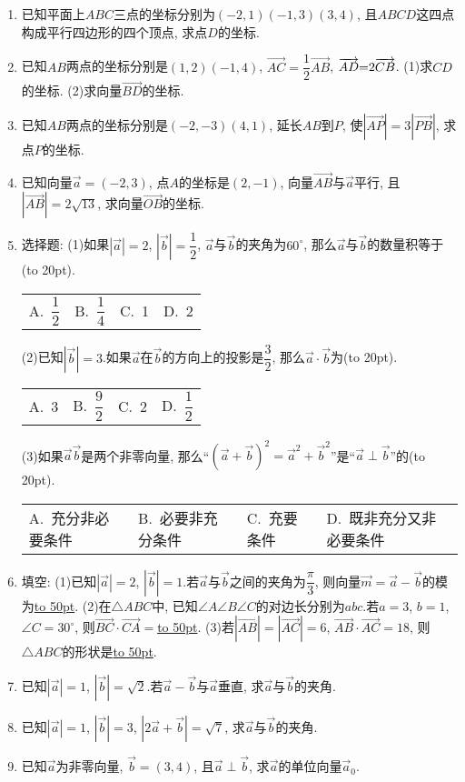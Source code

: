 \documentclass[10pt,a4paper]{article}
\newcommand{\blank}[1]{\underline{\hbox to #1pt{}}}
\newcommand{\bracket}[1]{(\hbox to #1pt{})}
\newcommand{\fourch}[4]{\par\begin{tabular}{p{.23\textwidth}p{.23\textwidth}p{.23\textwidth}p{.23\textwidth}}
A.~#1 &B.~#2& C.~#3& D.~#4
\end{tabular}}
\begin{document}
\begin{enumerate}[1.]
\item 已知平面上$ABC$三点的坐标分别为$(-2,1)(-1,3)(3,4)$, 且$ABCD$这四点构成平行四边形的四个顶点, 求点$D$的坐标.
\item 已知$AB$两点的坐标分别是$(1,2)(-1,4)$, $\overrightarrow{AC}=\dfrac 12\overrightarrow{AB}$, $\overrightarrow{AD}\text=2\overrightarrow{CB}$.
(1)求$CD$的坐标.
(2)求向量$\overrightarrow{BD}$的坐标.
\item 已知$AB$两点的坐标分别是$(-2,-3)(4,1)$, 延长$AB$到$P$, 使$|\overrightarrow{AP}|=3|\overrightarrow{PB}|$, 求点$P$的坐标.
\item 已知向量$\overrightarrow a=(-2,3)$, 点$A$的坐标是$(2,-1)$, 向量$\overrightarrow{AB}$与$\overrightarrow a$平行, 且$|\overrightarrow{AB}|=2\sqrt {13}$, 求向量$\overrightarrow{OB}$的坐标.
\item 选择题:
(1)如果$|\overrightarrow a|=2$, $|\overrightarrow b|=\dfrac 12$, $\overrightarrow a$与$\overrightarrow b$的夹角为$60^{\circ }$, 那么$\overrightarrow a$与$\overrightarrow b$的数量积等于\bracket{20}.
\fourch{$\dfrac 12$}{$\dfrac 14$}{1}{2}
(2)已知$|\overrightarrow b|=3$.如果$\overrightarrow a$在$\overrightarrow b$的方向上的投影是$\dfrac 32$, 那么$\overrightarrow a\cdot \overrightarrow b$为\bracket{20}.
\fourch{3}{$\dfrac 92$}{2}{$\dfrac 12$}
(3)如果$\overrightarrow a\overrightarrow b$是两个非零向量, 那么``$(\overrightarrow a+\overrightarrow b)^2=\overrightarrow a^2+\overrightarrow b^2$''是``$\overrightarrow a\perp \overrightarrow b$''的\bracket{20}.
\fourch{充分非必要条件}{必要非充分条件}{充要条件}{既非充分又非必要条件}
\item 填空:
(1)已知$|\overrightarrow a|=2$, $|\overrightarrow b|=1$.若$\overrightarrow a$与$\overrightarrow b$之间的夹角为$\dfrac{\pi }3$, 则向量$\overrightarrow m=\overrightarrow a-\overrightarrow b$的模为\blank{50}.
(2)在$\triangle ABC$中, 已知$\angle A\angle B\angle C$的对边长分别为$abc$.若$a=3$, $b=1$, $\angle C=30^{\circ }$, 则$\overrightarrow{BC}\cdot \overrightarrow{CA}=$\blank{50}.
(3)若$|\overrightarrow{AB}|=|\overrightarrow{AC}|=6$, $\overrightarrow{AB}\cdot \overrightarrow{AC}=18$, 则$\triangle ABC$的形状是\blank{50}.
\item 已知$|\overrightarrow a|=1$, $|\overrightarrow b|=\sqrt 2$.若$\overrightarrow a-\overrightarrow b$与$\overrightarrow a$垂直, 求$\overrightarrow a$与$\overrightarrow b$的夹角.
\item 已知$|\overrightarrow a|=1$, $|\overrightarrow b|=3$, $|2\overrightarrow a+\overrightarrow b|=\sqrt 7$, 求$\overrightarrow a$与$\overrightarrow b$的夹角.
\item 已知$\overrightarrow a$为非零向量, $\overrightarrow b=(3,4)$, 且$\overrightarrow a\perp \overrightarrow b$, 求$\overrightarrow a$的单位向量$\overrightarrow a_0$.

\end{enumerate}
\end{document}
